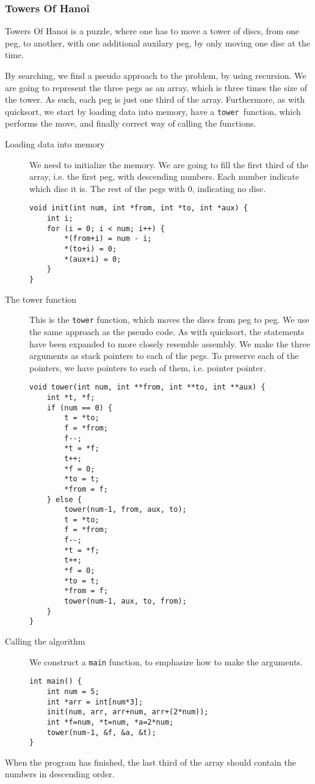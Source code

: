 \subsubsection*{Towers Of Hanoi}
Towers Of Hanoi is a puzzle, where one has to move a tower of discs, from one
peg, to another, with one additional auxilary peg, by only moving one disc at
the time.

By searching, we find a pseudo approach to the problem, by using
recursion\cite{ref:hanoi}. We are going to represent the three pegs
as an array, which is three times the size of the tower. As such, each peg is
just one third of the array. Furthermore, as with quicksort, we start by
loading data into memory, have a \texttt{tower} function, which performs the
move, and finally correct way of calling the functions.

\begin{description}
    \item[Loading data into memory] We need to initialize the memory. We are
        going to fill the first third of the array, i.e. the first peg, with
        descending numbers. Each number indicate which disc it is. The rest of
        the pegs with 0, indicating no disc.
\begin{lstlisting}
void init(int num, int *from, int *to, int *aux) {
    int i;
    for (i = 0; i < num; i++) {
        *(from+i) = num - i;
        *(to+i) = 0;
        *(aux+i) = 0;
    }
}
\end{lstlisting}

    \item[The tower function] This is the \texttt{tower} function, which
        moves the discs from peg to peg. We use the same approach as the pseudo
        code\cite{ref:hanoi}. As with quicksort, the statements have been
        expanded to more closely resemble assembly. We make the three arguments
        as stack pointers to each of the pegs. To preserve each of the
        pointers, we have pointers to each of them, i.e. pointer pointer.
\begin{lstlisting}
void tower(int num, int **from, int **to, int **aux) {
    int *t, *f;
    if (num == 0) {
        t = *to;
        f = *from;
        f--;
        *t = *f;
        t++;
        *f = 0;
        *to = t;
        *from = f;
    } else {
        tower(num-1, from, aux, to);
        t = *to;
        f = *from;
        f--;
        *t = *f;
        t++;
        *f = 0;
        *to = t;
        *from = f;
        tower(num-1, aux, to, from);
    }
}
\end{lstlisting}

    \item[Calling the algorithm] We construct a \texttt{main} function, to
        emphasize how to make the arguments.
\begin{lstlisting}
int main() {
    int num = 5;
    int *arr = int[num*3];
    init(num, arr, arr+num, arr+(2*num));
    int *f=num, *t=num, *a=2*num;
    tower(num-1, &f, &a, &t);
}
\end{lstlisting}
\end{description}
When the program has finished, the last third of the array should contain the
numbers in descending order.
